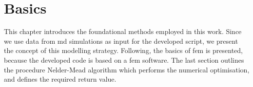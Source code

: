 



\chapter{Basics} \label{chap: basics}

This chapter introduces the foundational methods employed in this work. Since we use data from \acrfull{md} simulations as input for the developed script, we present the concept of this modelling strategy. Following, the basics of \acrshort{fem} is presented, because the developed code is based on a \acrshort{fem} software. The last section outlines the procedure Nelder-Mead algorithm which performs the numerical optimisation, and defines the required return value.

